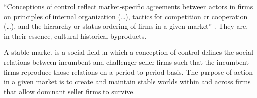 \documentclass[a4paper, 12pt, openright, oneside, german, french, brazil, english, article]{abntex2}
\begin{document}
	
	``Conceptions of control reflect market-specific agreements between actors in firms on principles of internal organization (\dots), tactics for competition or cooperation (\dots), and the hierarchy or status ordering of firms in a given market'' \cite[p. 35]{fligstein2002architecture}. They are, in their essence, cultural-historical byproducts.

	
	\begin{citacao}
		A stable market is a social field in which a conception of control defines the social relations between incumbent and challenger seller firms such that the incumbent firms reproduce those relations on a period-to-period basis. The purpose of action in a given market is to create and maintain stable worlds within and across firms that allow dominant seller firms to survive. \cite[p. 35]{fligstein2002architecture}
	\end{citacao}
	
\end{document}
